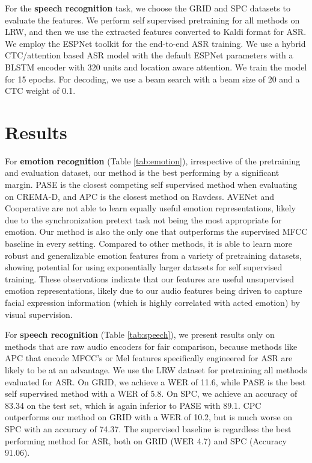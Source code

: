 \documentclass{article}
\begin{document}
For the \textbf{speech recognition} task, we choose the GRID and SPC datasets to evaluate the features. We perform self supervised pretraining for all methods on LRW, and then we use the extracted features converted to Kaldi format for ASR. We employ the ESPNet \cite{watanabe2018espnet} toolkit for the end-to-end ASR training. We use a hybrid CTC/attention based ASR model with the default ESPNet parameters with a BLSTM encoder with 320 units and location aware attention. We train the model for 15 epochs. For decoding, we use a beam search with a beam size of 20 and a CTC weight of 0.1.

\section{Results}
\label{sec:results}

For \textbf{emotion recognition} (Table \ref{tab:emotion}), irrespective of the pretraining and evaluation dataset, our method is the best performing by a significant margin. PASE is the closest competing self supervised method when evaluating on CREMA-D, and APC is the closest method on Ravdess. AVENet and Cooperative are not able to learn equally useful emotion representations, likely due to the synchronization pretext task not being the most appropriate for emotion. Our method is also the only one that outperforms the supervised MFCC baseline in every setting. Compared to other methods, it is able to learn more robust and generalizable emotion features from a variety of pretraining datasets, showing potential for using exponentially larger datasets for self supervised training. These observations indicate that our features are useful unsupervised emotion representations, likely due to our audio features being driven to capture facial expression information (which is highly correlated with acted emotion) by visual supervision.

For \textbf{speech recognition} (Table \ref{tab:speech}), we present results only on methods that are raw audio encoders for fair comparison, because methods like APC that encode MFCC's or Mel features specifically engineered for ASR are likely to be at an advantage. We use the LRW dataset for pretraining all methods evaluated for ASR. On GRID, we achieve a WER of 11.6, while PASE is the best self supervised method with a WER of 5.8. On SPC, we achieve an accuracy of 83.34 on the test set, which is again inferior to PASE with 89.1. CPC outperforms our method on GRID with a WER of 10.2, but is much worse on SPC with an accuracy of 74.37. The supervised baseline is regardless the best performing method for ASR, both on GRID (WER 4.7) and SPC (Accuracy 91.06). 
\end{document}
